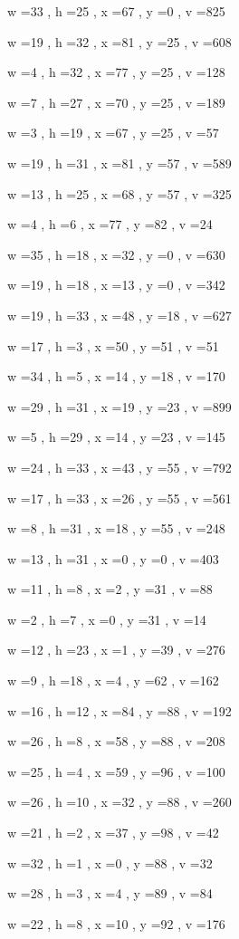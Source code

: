 \documentclass[11pt]{article}
\begin{document}
w =33 , h =25 , x =67 , y =0 , v =825
\par
w =19 , h =32 , x =81 , y =25 , v =608
\par
w =4 , h =32 , x =77 , y =25 , v =128
\par
w =7 , h =27 , x =70 , y =25 , v =189
\par
w =3 , h =19 , x =67 , y =25 , v =57
\par
w =19 , h =31 , x =81 , y =57 , v =589
\par
w =13 , h =25 , x =68 , y =57 , v =325
\par
w =4 , h =6 , x =77 , y =82 , v =24
\par
w =35 , h =18 , x =32 , y =0 , v =630
\par
w =19 , h =18 , x =13 , y =0 , v =342
\par
w =19 , h =33 , x =48 , y =18 , v =627
\par
w =17 , h =3 , x =50 , y =51 , v =51
\par
w =34 , h =5 , x =14 , y =18 , v =170
\par
w =29 , h =31 , x =19 , y =23 , v =899
\par
w =5 , h =29 , x =14 , y =23 , v =145
\par
w =24 , h =33 , x =43 , y =55 , v =792
\par
w =17 , h =33 , x =26 , y =55 , v =561
\par
w =8 , h =31 , x =18 , y =55 , v =248
\par
w =13 , h =31 , x =0 , y =0 , v =403
\par
w =11 , h =8 , x =2 , y =31 , v =88
\par
w =2 , h =7 , x =0 , y =31 , v =14
\par
w =12 , h =23 , x =1 , y =39 , v =276
\par
w =9 , h =18 , x =4 , y =62 , v =162
\par
w =16 , h =12 , x =84 , y =88 , v =192
\par
w =26 , h =8 , x =58 , y =88 , v =208
\par
w =25 , h =4 , x =59 , y =96 , v =100
\par
w =26 , h =10 , x =32 , y =88 , v =260
\par
w =21 , h =2 , x =37 , y =98 , v =42
\par
w =32 , h =1 , x =0 , y =88 , v =32
\par
w =28 , h =3 , x =4 , y =89 , v =84
\par
w =22 , h =8 , x =10 , y =92 , v =176
\par
\newpage
\end{document}
